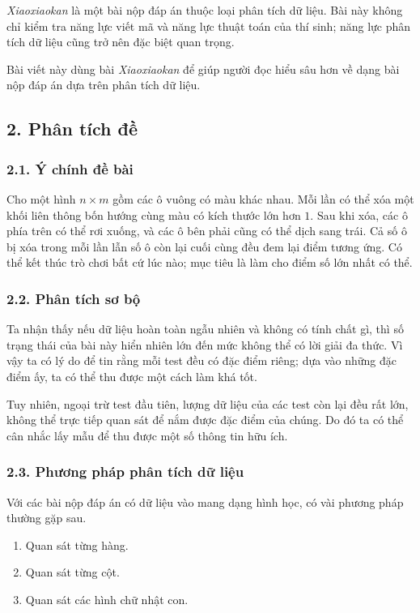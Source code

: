 \documentclass[11pt]{article}
\begin{document}
\emph{Xiaoxiaokan} là một bài nộp đáp án thuộc loại phân tích dữ liệu. Bài này
không chỉ kiểm tra năng lực viết mã và năng lực thuật toán của thí sinh; năng
lực phân tích dữ liệu cũng trở nên đặc biệt quan trọng.

Bài viết này dùng bài \emph{Xiaoxiaokan} để giúp người đọc hiểu sâu hơn về
dạng bài nộp đáp án dựa trên phân tích dữ liệu.

\subsection*{2. Phân tích đề}

\subsubsection*{2.1. Ý chính đề bài}

Cho một hình \(n\times m\) gồm các ô vuông có màu khác nhau. Mỗi lần có thể
xóa một khối liên thông bốn hướng cùng màu có kích thước lớn hơn \(1\). Sau
khi xóa, các ô phía trên có thể rơi xuống, và các ô bên phải cũng có thể dịch
sang trái. Cả số ô bị xóa trong mỗi lần lẫn số ô còn lại cuối cùng đều đem
lại điểm tương ứng. Có thể kết thúc trò chơi bất cứ lúc nào; mục tiêu là làm
cho điểm số lớn nhất có thể.

\subsubsection*{2.2. Phân tích sơ bộ}

Ta nhận thấy nếu dữ liệu hoàn toàn ngẫu nhiên và không có tính chất gì, thì số
trạng thái của bài này hiển nhiên lớn đến mức không thể có lời giải đa thức.
Vì vậy ta có lý do để tin rằng mỗi test đều có đặc điểm riêng; dựa vào những
đặc điểm ấy, ta có thể thu được một cách làm khá tốt.

Tuy nhiên, ngoại trừ test đầu tiên, lượng dữ liệu của các test còn lại đều rất
lớn, không thể trực tiếp quan sát để nắm được đặc điểm của chúng. Do đó ta có
thể cân nhắc lấy mẫu để thu được một số thông tin hữu ích.

\subsubsection*{2.3. Phương pháp phân tích dữ liệu}

Với các bài nộp đáp án có dữ liệu vào mang dạng hình học, có vài phương pháp
thường gặp sau.

\begin{enumerate}
  \item Quan sát từng hàng.
  \item Quan sát từng cột.
  \item Quan sát các hình chữ nhật con.
\end{enumerate}
\end{document}
